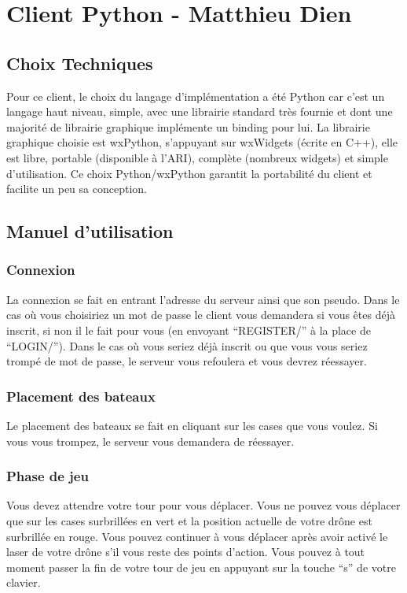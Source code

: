 \documentclass[a4paper, 11pt]{report}
\begin{document}
\chapter{Client Python - Matthieu Dien}

\section{Choix Techniques}

Pour ce client, le choix du langage d'implémentation a été Python car c'est un langage haut niveau, simple, 
avec une librairie standard très fournie et dont une majorité de librairie graphique implémente
un binding pour lui. La librairie graphique choisie est wxPython, s'appuyant sur wxWidgets (écrite en C++), elle est libre, portable 
(disponible à l'ARI), complète (nombreux widgets) et simple d'utilisation.
Ce choix Python/wxPython garantit la portabilité du client et facilite un peu sa conception.

\section{Manuel d'utilisation}
\subsection{Connexion}
La connexion se fait en entrant l'adresse du serveur ainsi que son pseudo. Dans le cas où vous choisiriez un mot de passe le client 
vous demandera si vous êtes déjà inscrit, si non il le fait pour vous (en envoyant ``REGISTER/'' à la place de ``LOGIN/''). Dans le cas où vous seriez déjà 
inscrit ou que vous vous seriez trompé de mot de passe, le serveur vous refoulera et vous devrez réessayer.

\subsection{Placement des bateaux}
Le placement des bateaux se fait en cliquant sur les cases que vous voulez. Si vous vous trompez, le serveur vous demandera de réessayer.

\subsection{Phase de jeu}
Vous devez attendre votre tour pour vous déplacer. Vous ne pouvez vous déplacer que sur les cases surbrillées en vert et la position 
actuelle de votre drône est surbrillée en rouge. Vous pouvez continuer à vous déplacer après avoir activé le laser de votre drône s'il vous reste des points d'action. 
Vous pouvez à tout moment passer la fin de votre tour de jeu en appuyant sur la touche ``s'' de votre clavier.
\end{document}
